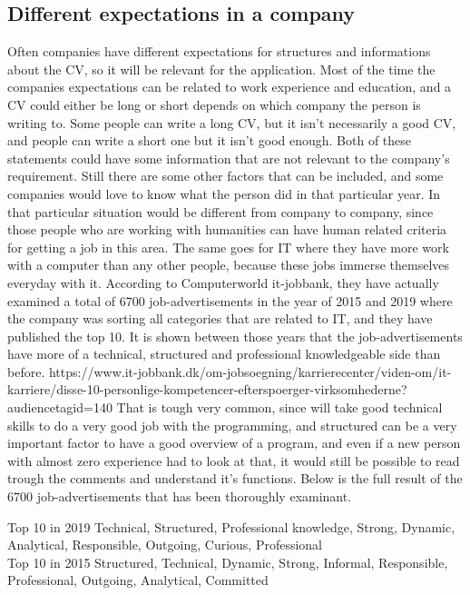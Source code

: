 \subsection{Different expectations in a company}
Often companies have different expectations for structures and informations about the CV, so it will be relevant for the application.
Most of the time the companies expectations can be related to work experience and education,
and a CV could either be long or short depends on which company the person is writing to. Some people can write a long CV,
but it isn't necessarily a good CV, and people can write a short one but it isn't good enough.
Both of these statements could have some information that are not relevant to the company's requirement. Still there are some other
factors that can be included, and some companies would love to know what the person did in that particular year.
In that particular situation would be different from company to company, since those people who are working with humanities
can have human related criteria for getting a job in this area. The same goes for IT where they have more work with a computer
than any other people, because these jobs immerse themselves everyday with it. According to Computerworld it-jobbank,
they have actually examined a total of 6700 job-advertisements in the year of 2015 and 2019 where the company was sorting all categories
that are related to IT, and they have published the top 10. It is shown between those years that the job-advertisements
have more of a technical, structured and professional knowledgeable side than before.
https://www.it-jobbank.dk/om-jobsoegning/karrierecenter/viden-om/it-karriere/disse-10-personlige-kompetencer-efterspoerger-virksomhederne?audiencetagid=140
That is tough very common, since will take good technical skills to do a very good job with the programming,
and structured can be a very important factor to have a good overview of a program,
and even if a new person with almost zero experience had to look at that,
it would still be possible to read trough the comments and understand it's functions. Below is the full result
of the 6700 job-advertisements that has been thoroughly examinant.

Top 10 in 2019
Technical,
Structured,
Professional knowledge,
Strong,
Dynamic,
Analytical,
Responsible,
Outgoing,
Curious,
Professional \\

Top 10 in 2015
Structured,
Technical,
Dynamic,
Strong,
Informal,
Responsible,
Professional,
Outgoing,
Analytical,
Committed \\

